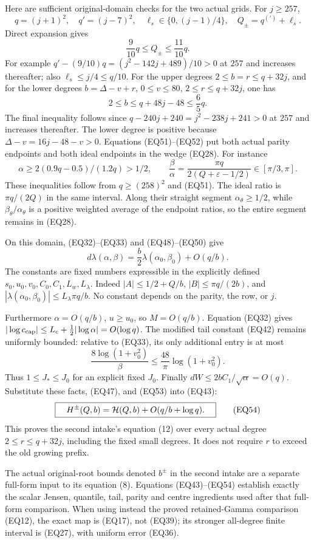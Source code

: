 \documentclass[11pt,a4paper]{article}
\begin{document}
Here are sufficient original-domain checks for the two actual grids.
For \(j\ge257\),
\[
 q=(j+1)^2,\quad q'=(j-7)^2,\quad
 \ell_s\in\{0,(j-1)/4\},\quad Q_\pm=q^{(\prime)}+\ell_s.
\]
Direct expansion gives
\[
 \frac9{10}q\le Q_\pm\le\frac{11}{10}q.
\tag{EQ51}
\]
For example \(q'-(9/10)q=(j^2-142j+489)/10>0\) at \(257\)
and increases thereafter; also \(\ell_s\le j/4\le q/10\).
For the upper degrees \(2\le b=r\le q+32j\), and for the lower
degrees \(b=\Delta-v+r\), \(0\le v\le80\), \(2\le r\le q+32j\),
one has
\[
 2\le b\le q+48j-48\le\frac65q.
\tag{EQ52}
\]
The final inequality follows since
\(q-240j+240=j^2-238j+241>0\) at \(257\) and increases thereafter.
The lower degree is positive because \(\Delta-v=16j-48-v>0\).
Equations (EQ51)--(EQ52) put both actual parity endpoints and both ideal
endpoints in the wedge (EQ28).  For instance
\[
 \alpha\ge 2(0.9q-0.5)/(1.2q)>1/2,\qquad
 \frac{\beta}{\alpha}
     =\frac{\pi q}{2(Q+\varepsilon-1/2)}\in[\pi/3,\pi].
\]
These inequalities follow from \(q\ge(258)^2\) and (EQ51).
The ideal ratio is \(\pi q/(2Q)\) in the same interval.
Along their straight segment \(\alpha_\theta\ge1/2\), while
\(\beta_\theta/\alpha_\theta\) is a positive weighted average of
the endpoint ratios, so the entire segment remains in (EQ28).

On this domain, (EQ32)--(EQ33) and (EQ48)--(EQ50) give
\[
 d\lambda(\alpha,\beta)
      =\frac b2\lambda(\alpha_0,\beta_0)+O(q/b).
\tag{EQ53}
\]
The constants are fixed numbers expressible in the explicitly defined
\(s_0,u_0,v_0,C_0,C_1,L_w,L_\lambda\).
Indeed \(|A|\le1/2+Q/b\), \(|B|\le\pi q/(2b)\),
and \(|\lambda(\alpha_0,\beta_0)|\le L_\lambda\pi q/b\).
No constant depends on the parity, the row, or \(j\).

Furthermore \(\alpha=O(q/b)\), \(u\ge u_0\), so \(M=O(q/b)\).
Equation (EQ32) gives
\(|\log c_{\rm cap}|\le L_c+\tfrac12|\log\alpha|=O(\log q)\).
The modified tail constant (EQ42) remains uniformly bounded: relative
to (EQ33), its only additional entry is at most
\[
 \frac{8\log(1+v_0^2)}{\beta}
 \le \frac{48}{\pi}\log(1+v_0^2).
\]
Thus \(1\le J_*\le J_0\) for an explicit fixed \(J_0\).
Finally \(dW\le 2bC_1/\sqrt\alpha=O(q)\).
Substitute these facts, (EQ47), and (EQ53) into (EQ43):
\[
 \boxed{\quad H^\pm(Q,b)
      ={\cal H}(Q,b)+O(q/b+\log q).\quad}
\tag{EQ54}
\]
This proves the second intake's equation (12) over every actual
degree \(2\le r\le q+32j\), including the fixed small degrees.
It does not require \(r\) to exceed the old growing prefix.

The actual original-root bounds denoted \(b^\pm\) in the second intake
are a separate full-form input to its equation (8).  Equations
(EQ43)--(EQ54) establish exactly the scalar Jensen, quantile, tail,
parity and centre ingredients used after that full-form comparison.
When using instead the proved retained-Gamma comparison (EQ12), the
exact map is (EQ17), not (EQ39); its stronger all-degree finite interval
is (EQ27), with uniform error (EQ36).
\end{document}
